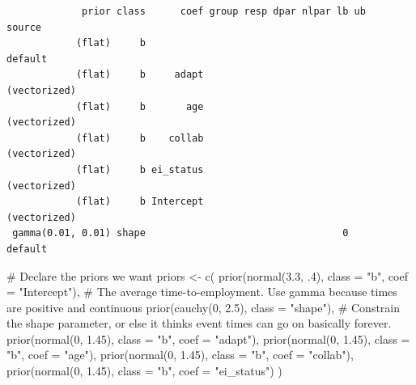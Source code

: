 \documentclass[
  letterpaper,
  DIV=11,
  numbers=noendperiod]{scrreprt}
\newenvironment{Shaded}{\begin{snugshade}}{\end{snugshade}}
\newcommand{\AttributeTok}[1]{\textcolor[rgb]{0.40,0.45,0.13}{#1}}
\newcommand{\CommentTok}[1]{\textcolor[rgb]{0.37,0.37,0.37}{#1}}
\newcommand{\DecValTok}[1]{\textcolor[rgb]{0.68,0.00,0.00}{#1}}
\newcommand{\FloatTok}[1]{\textcolor[rgb]{0.68,0.00,0.00}{#1}}
\newcommand{\FunctionTok}[1]{\textcolor[rgb]{0.28,0.35,0.67}{#1}}
\newcommand{\NormalTok}[1]{\textcolor[rgb]{0.00,0.23,0.31}{#1}}
\newcommand{\OtherTok}[1]{\textcolor[rgb]{0.00,0.23,0.31}{#1}}
\newcommand{\StringTok}[1]{\textcolor[rgb]{0.13,0.47,0.30}{#1}}
\begin{document}
\begin{verbatim}
             prior class      coef group resp dpar nlpar lb ub       source
            (flat)     b                                            default
            (flat)     b     adapt                             (vectorized)
            (flat)     b       age                             (vectorized)
            (flat)     b    collab                             (vectorized)
            (flat)     b ei_status                             (vectorized)
            (flat)     b Intercept                             (vectorized)
 gamma(0.01, 0.01) shape                                  0         default
\end{verbatim}

\begin{Shaded}
\begin{Highlighting}[]
\CommentTok{\# Declare the priors we want}
\NormalTok{priors }\OtherTok{\textless{}{-}} \FunctionTok{c}\NormalTok{(}
    \FunctionTok{prior}\NormalTok{(}\FunctionTok{normal}\NormalTok{(}\FloatTok{3.3}\NormalTok{, .}\DecValTok{4}\NormalTok{), }\AttributeTok{class =} \StringTok{"b"}\NormalTok{, }\AttributeTok{coef =} \StringTok{"Intercept"}\NormalTok{), }\CommentTok{\# The average time{-}to{-}employment. Use gamma because times are positive and continuous}
    \FunctionTok{prior}\NormalTok{(}\FunctionTok{cauchy}\NormalTok{(}\DecValTok{0}\NormalTok{, }\FloatTok{2.5}\NormalTok{), }\AttributeTok{class =} \StringTok{"shape"}\NormalTok{), }\CommentTok{\# Constrain the shape parameter, or else it thinks event times can go on basically forever.}
    \FunctionTok{prior}\NormalTok{(}\FunctionTok{normal}\NormalTok{(}\DecValTok{0}\NormalTok{, }\FloatTok{1.45}\NormalTok{), }\AttributeTok{class =} \StringTok{"b"}\NormalTok{, }\AttributeTok{coef =} \StringTok{"adapt"}\NormalTok{),}
    \FunctionTok{prior}\NormalTok{(}\FunctionTok{normal}\NormalTok{(}\DecValTok{0}\NormalTok{, }\FloatTok{1.45}\NormalTok{), }\AttributeTok{class =} \StringTok{"b"}\NormalTok{, }\AttributeTok{coef =} \StringTok{"age"}\NormalTok{),}
    \FunctionTok{prior}\NormalTok{(}\FunctionTok{normal}\NormalTok{(}\DecValTok{0}\NormalTok{, }\FloatTok{1.45}\NormalTok{), }\AttributeTok{class =} \StringTok{"b"}\NormalTok{, }\AttributeTok{coef =} \StringTok{"collab"}\NormalTok{),}
    \FunctionTok{prior}\NormalTok{(}\FunctionTok{normal}\NormalTok{(}\DecValTok{0}\NormalTok{, }\FloatTok{1.45}\NormalTok{), }\AttributeTok{class =} \StringTok{"b"}\NormalTok{, }\AttributeTok{coef =} \StringTok{"ei\_status"}\NormalTok{)}
\NormalTok{  )}


\end{Highlighting}
\end{Shaded}
\end{document}
